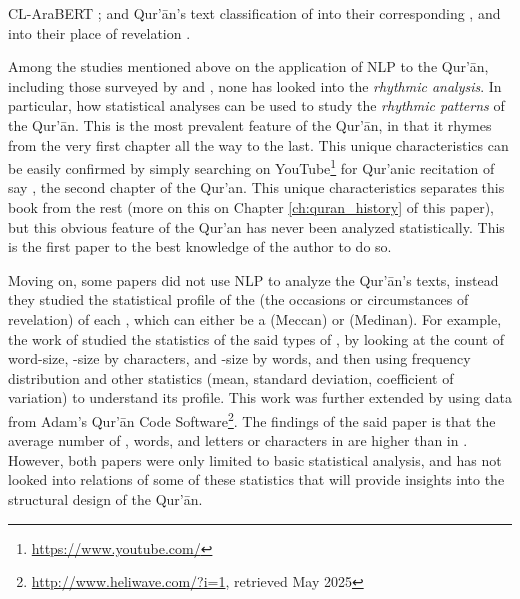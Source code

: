 CL-AraBERT ; and Qur'\=an's text classification of   into their corresponding   , and into their place of revelation .

Among the studies mentioned above on the application of NLP to the Qur'\=an, including those surveyed by  and , none has looked into the \textit{rhythmic analysis}. In particular, how statistical analyses can be used to study the \textit{rhythmic patterns} of the Qur'\=an. This is the most prevalent feature of the Qur'\=an, in that it rhymes from the very first chapter all the way to the last. This unique characteristics can be easily confirmed by simply searching on YouTube\footnote{\url{https://www.youtube.com/}} for Qur'anic recitation of say  , the second chapter of the Qur'an. This unique characteristics separates this book from the rest (more on this on Chapter \ref{ch:quran_history} of this paper), but this obvious feature of the Qur'an has never been analyzed statistically. This is the first paper to the best knowledge of the author to do so. 

Moving on, some papers did not use NLP to analyze the Qur'\=an's texts, instead they studied the statistical profile of the   (the occasions or circumstances of revelation) of each  , which can either be a   (Meccan) or   (Medinan). For example, the work of  studied the statistics of the said types of  , by looking at the count of word-size,  -size by characters, and  -size by words, and then using frequency distribution and other statistics (mean, standard deviation, coefficient of variation) to understand its profile. This work was further extended by  using data from Adam's Qur'\=an Code Software\footnote{\url{http://www.heliwave.com/?i=1}, retrieved May 2025}. The findings of the said paper is that the average number of  , words, and letters or characters in   are higher than in  . However, both papers were only limited to basic statistical analysis, and has not looked into relations of some of these statistics that will provide insights into the structural design of the Qur'\=an.

